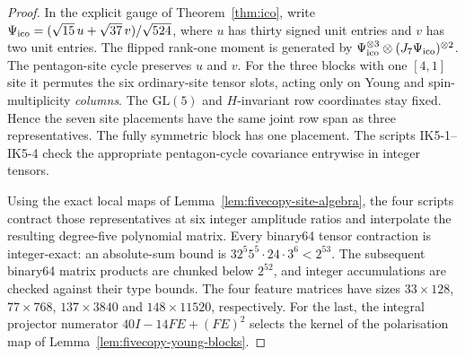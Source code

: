 \begin{proof}
In the explicit gauge of Theorem~\ref{thm:ico}, write
$\Psi_{\rm ico}=(\sqrt{15}\,u+\sqrt{37}\,v)/\sqrt{524}$,
where $u$ has thirty signed unit entries and $v$ has two unit entries.
The flipped rank-one moment is generated by
$\Psi_{\rm ico}^{\otimes3}\otimes(J_7\Psi_{\rm ico})^{\otimes2}$.
The pentagon-site cycle preserves $u$ and $v$.  For the three blocks
with one $[4,1]$ site it permutes the six ordinary-site tensor slots,
acting only on Young and spin-multiplicity \emph{columns}.  The
$\mathrm{GL}(5)$ and $H$-invariant row coordinates stay fixed.  Hence
the seven site placements have the same joint row span as three
representatives.  The fully symmetric block has one placement.  The
scripts IK5-1--IK5-4 check the appropriate pentagon-cycle covariance entrywise
in integer tensors.

Using the exact local maps of Lemma~\ref{lem:fivecopy-site-algebra}, the
four scripts contract those representatives at six integer amplitude ratios
and interpolate the resulting degree-five polynomial matrix.  Every
binary64 tensor contraction is integer-exact: an absolute-sum bound is
$32^5 5^5\cdot24\cdot3^6<2^{53}$.  The subsequent binary64 matrix
products are chunked below $2^{52}$, and integer accumulations are
checked against their type bounds.  The four feature matrices have
sizes $33\times128$, $77\times768$, $137\times3840$ and
$148\times11520$, respectively.  For the last, the integral projector numerator
$40I-14FE+(FE)^2$ selects the kernel of the polarisation map of
Lemma~\ref{lem:fivecopy-young-blocks}.


\end{proof}

